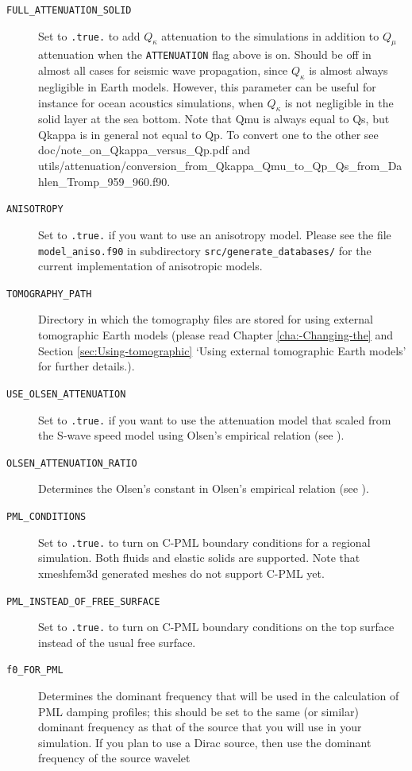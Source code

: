 \begin{description}
\item [{\texttt{FULL\_ATTENUATION\_SOLID}}] Set to \texttt{.true.} to add
$Q_{\kappa}$ attenuation to the simulations in addition to $Q_{\mu}$
attenuation when the \texttt{ATTENUATION} flag above is on. Should
be off in almost all cases for seismic wave propagation, since $Q_{\kappa}$
is almost always negligible in Earth models. However, this parameter
can be useful for instance for ocean acoustics simulations, when $Q_{\kappa}$
is not negligible in the solid layer at the sea bottom.
Note that Qmu is always equal to Qs, but Qkappa is in general not equal to Qp. To convert one to the other see doc/note\_on\_Qkappa\_versus\_Qp.pdf and utils/attenuation/conversion\_from\_Qkappa\_Qmu\_to\_Qp\_Qs\_from\_Dahlen\_Tromp\_959\_960.f90.
\item [{\texttt{ANISOTROPY}}] Set to \texttt{.true.} if you want to use
an anisotropy model. Please see the file \texttt{model\_aniso.f90}
in subdirectory \texttt{src/generate\_databases/} for the current
implementation of anisotropic models.
\item [{\texttt{TOMOGRAPHY\_PATH}}] Directory in which the tomography files
are stored for using external tomographic Earth models (please read
Chapter \ref{cha:-Changing-the} and Section \ref{sec:Using-tomographic}
`Using external tomographic Earth models' for further details.).
\item [{\texttt{USE\_OLSEN\_ATTENUATION}}] Set to \texttt{.true.} if you
want to use the attenuation model that scaled from the S-wave speed
model using Olsen's empirical relation (see \citet{OlDaBr03}).
\item [{\texttt{OLSEN\_ATTENUATION\_RATIO}}] Determines the Olsen's constant
in Olsen's empirical relation (see \citet{OlDaBr03}).
\item [{\texttt{PML\_CONDITIONS}}] Set to \texttt{.true.} to turn on C-PML
boundary conditions for a regional simulation. Both fluids and elastic
solids are supported. Note that xmeshfem3d generated meshes do not support C-PML yet.
\item [{\texttt{PML\_INSTEAD\_OF\_FREE\_SURFACE}}] Set to \texttt{.true.}
to turn on C-PML boundary conditions on the top surface instead of
the usual free surface.
\item [{\texttt{f0\_FOR\_PML}}] Determines the dominant frequency that
will be used in the calculation of PML damping profiles; this should
be set to the same (or similar) dominant frequency as that of the
source that you will use in your simulation. If you plan to use a
Dirac source, then use the dominant frequency of the source wavelet

\end{description}
